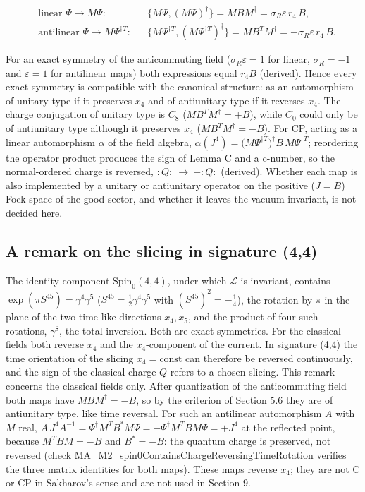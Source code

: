 \documentclass[11pt]{article}
\begin{document}
\[
\begin{aligned}
&\text{linear }\Psi\to M\Psi:&&\{M\Psi,(M\Psi)^\dagger\}=MBM^\dagger=\sigma_R\varepsilon\,r_4\,B,\\
&\text{antilinear }\Psi\to M\Psi^{\dagger T}:&&\{M\Psi^{\dagger T},(M\Psi^{\dagger T})^\dagger\}=MB^TM^\dagger=-\sigma_R\varepsilon\,r_4\,B .
\end{aligned}
\]

For an exact symmetry of the anticommuting field ($\sigma_R\varepsilon=1$ for linear, $\sigma_R=-1$ and $\varepsilon=1$ for antilinear maps) both expressions equal $r_4B$ (derived). Hence every exact symmetry is compatible with the canonical structure: as an automorphism of unitary type if it preserves $x_4$ and of antiunitary type if it reverses $x_4$. The charge conjugation of unitary type is $C_8$ ($MB^TM^\dagger=+B$), while $C_0$ could only be of antiunitary type although it preserves $x_4$ ($MB^TM^\dagger=-B$). For CP, acting as a linear automorphism $\alpha$ of the field algebra, $\alpha(J^4)=\bigl(M\Psi^{\dagger T}\bigr)^\dagger B\,M\Psi^{\dagger T}$; reordering the operator product produces the sign of Lemma C and a c-number, so the normal-ordered charge is reversed, $:Q:\ \to\ -:Q:$ (derived). Whether each map is also implemented by a unitary or antiunitary operator on the positive ($J=B$) Fock space of the good sector, and whether it leaves the vacuum invariant, is not decided here.

\subsection{A remark on the slicing in signature (4,4)}

The identity component $\mathrm{Spin}_0(4,4)$, under which $\mathcal L$ is invariant, contains $\exp(\pi S^{45})=\gamma^4\gamma^5$ ($S^{45}=\tfrac12\gamma^4\gamma^5$ with $(S^{45})^2=-\tfrac14$), the rotation by $\pi$ in the plane of the two time-like directions $x_4,x_5$, and the product of four such rotations, $\gamma^8$, the total inversion. Both are exact symmetries. For the classical fields both reverse $x_4$ and the $x_4$-component of the current. In signature (4,4) the time orientation of the slicing $x_4=\text{const}$ can therefore be reversed continuously, and the sign of the classical charge $Q$ refers to a chosen slicing. This remark concerns the classical fields only. After quantization of the anticommuting field both maps have $MBM^\dagger=-B$, so by the criterion of Section 5.6 they are of antiunitary type, like time reversal. For such an antilinear automorphism $A$ with $M$ real, $A\,J^4A^{-1}=\Psi^\dagger M^TB^\ast M\Psi=-\Psi^\dagger M^TBM\Psi=+J^4$ at the reflected point, because $M^TBM=-B$ and $B^\ast=-B$: the quantum charge is preserved, not reversed (check MA\_M2\_spin0ContainsChargeReversingTimeRotation verifies the three matrix identities for both maps). These maps reverse $x_4$; they are not C or CP in Sakharov's sense and are not used in Section 9.
\end{document}
